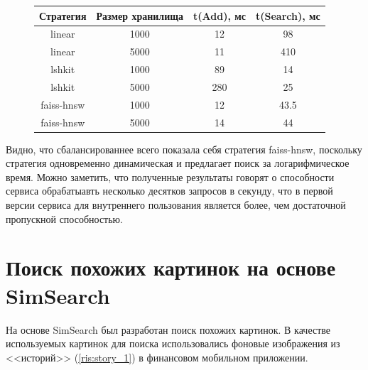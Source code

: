 \documentclass[a4paper,12pt]{extarticle}
\begin{document}
\begin{figure}[H]
\centering
{}
\label{tab:benchmark}
\begin{tabular}{|c|c|c|c|}
\hline
    Стратегия & Размер хранилища &  t(Add), мс & t(Search), мс \\
     \hline
    linear & 1000 & 12 & 98 \\
    \hline 
    linear & 5000 & 11 & 410 \\
    \hline 
    lshkit & 1000 & 89 & 14 \\
    \hline 
    lshkit & 5000 & 280 & 25 \\
    \hline 
    faiss-hnsw & 1000 & 12 & 43.5 \\
    \hline 
    faiss-hnsw & 5000 & 14 & 44 \\
    \hline 
\end{tabular}
\end{figure}

Видно, что сбалансированнее всего показала себя стратегия faiss-hnsw, поскольку стратегия одновременно динамическая и предлагает поиск за логарифмическое время. Можно заметить, что полученные результаты говорят о способности сервиса обрабатыавть несколько десятков запросов в секунду, что в первой версии сервиса для внутреннего пользования является более, чем достаточной пропускной способностью.

\newpage

\section{Поиск похожих картинок на основе SimSearch}

На основе SimSearch был разработан поиск похожих картинок. В качестве используемых картинок для поиска использовались фоновые изображения из <<историй>> (\cref{ris:story_1}) в финансовом мобильном приложении.
\end{document}
